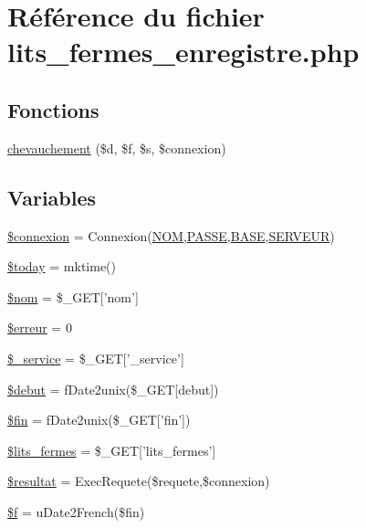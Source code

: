 \hypertarget{lits__fermes__enregistre_8php}{
\section{R\'{e}f\'{e}rence du fichier lits\_\-fermes\_\-enregistre.php}
\label{lits__fermes__enregistre_8php}
}
\subsection*{Fonctions}
\begin{CompactItemize}
\item 
\hyperlink{lits__fermes__enregistre_8php_a10}{chevauchement} (\$d, \$f, \$s, \$connexion)
\end{CompactItemize}
\subsection*{Variables}
\begin{CompactItemize}
\item 
\hyperlink{lits__fermes__enregistre_8php_a0}{\$connexion} = Connexion(\hyperlink{pma__connect_8php_a0}{NOM},\hyperlink{pma__connect_8php_a1}{PASSE},\hyperlink{pma__connect_8php_a3}{BASE},\hyperlink{pma__connect_8php_a2}{SERVEUR})
\item 
\hyperlink{lits__fermes__enregistre_8php_a1}{\$today} = mktime()
\item 
\hyperlink{lits__fermes__enregistre_8php_a2}{\$nom} = \$\_\-GET\mbox{[}'nom'\mbox{]}
\item 
\hyperlink{lits__fermes__enregistre_8php_a3}{\$erreur} = 0
\item 
\hyperlink{lits__fermes__enregistre_8php_a4}{\$\_\-service} = \$\_\-GET\mbox{[}'\_\-service'\mbox{]}
\item 
\hyperlink{lits__fermes__enregistre_8php_a5}{\$debut} = f\-Date2unix(\$\_\-GET\mbox{[}debut\mbox{]})
\item 
\hyperlink{lits__fermes__enregistre_8php_a6}{\$fin} = f\-Date2unix(\$\_\-GET\mbox{[}'fin'\mbox{]})
\item 
\hyperlink{lits__fermes__enregistre_8php_a7}{\$lits\_\-fermes} = \$\_\-GET\mbox{[}'lits\_\-fermes'\mbox{]}
\item 
\hyperlink{lits__fermes__enregistre_8php_a8}{\$resultat} = Exec\-Requete(\$requete,\$connexion)
\item 
\hyperlink{lits__fermes__enregistre_8php_a9}{\$f} = u\-Date2French(\$fin)
\end{CompactItemize}


